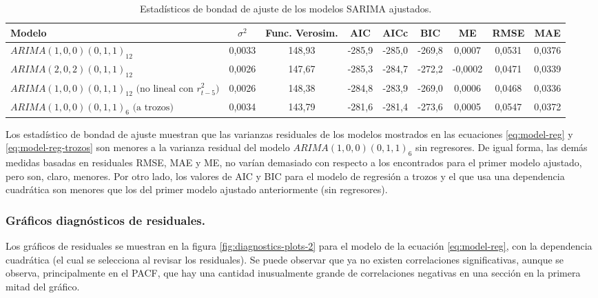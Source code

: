\documentclass[]{article}
\begin{document}
\begin{table}

\caption{\label{tab:lagged-regression}Estadísticos de bondad de ajuste de los modelos SARIMA ajustados.}
\centering
\begin{tabular}[t]{l|c|c|c|c|c|c|c|c}
\hline
Modelo & $\sigma^2$ & Func. Verosim. & AIC & AICc & BIC & ME & RMSE & MAE\\
\hline
$ARIMA(1,0,0)(0,1,1)_{12}$ & 0,0033 & 148,93 & -285,9 & -285,0 & -269,8 & 0,0007 & 0,0531 & 0,0376\\
\hline
$ARIMA(2,0,2)(0,1,1)_{12}$ & 0,0026 & 147,67 & -285,3 & -284,7 & -272,2 & -0,0002 & 0,0471 & 0,0339\\
\hline
$ARIMA(1,0,0)(0,1,1)_{12} \text{ (no lineal con }r_{t-5}^2\text{)}$ & 0,0026 & 148,38 & -284,8 & -283,9 & -269,0 & 0,0006 & 0,0468 & 0,0336\\
\hline
$ARIMA(1,0,0)(0,1,1)_6 \text{ (a trozos)}$ & 0,0034 & 143,79 & -281,6 & -281,4 & -273,6 & 0,0005 & 0,0547 & 0,0372\\
\hline
\end{tabular}
\end{table}

Los estadístico de bondad de ajuste muestran que las varianzas residuales de los modelos mostrados en las ecuaciones \eqref{eq:model-reg} y \eqref{eq:model-reg-trozos} son menores a la varianza residual del modelo \(ARIMA(1,0,0)(0,1,1)_6\) sin regresores.
De igual forma, las demás medidas basadas en residuales RMSE, MAE y ME, no varían demasiado con respecto a los encontrados para el primer modelo ajustado, pero son, claro, menores.
Por otro lado, los valores de AIC y BIC para el modelo de regresión a trozos y el que usa una dependencia cuadrática son menores que los del primer modelo ajustado anteriormente (sin regresores).

\hypertarget{gruxe1ficos-diagnuxf3sticos-de-residuales.-1}{%
\subsubsection{Gráficos diagnósticos de residuales.}\label{gruxe1ficos-diagnuxf3sticos-de-residuales.-1}}

Los gráficos de residuales se muestran en la figura \ref{fig:diagnostics-plots-2} para el modelo de la ecuación \eqref{eq:model-reg}, con la dependencia cuadrática (el cual se selecciona al revisar los residuales).
Se puede observar que ya no existen correlaciones significativas, aunque se observa, principalmente en el PACF, que hay una cantidad inusualmente grande de correlaciones negativas en una sección en la primera mitad del gráfico.
\end{document}
